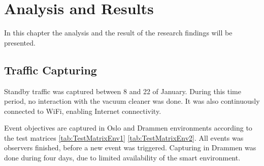 \chapter{Analysis and Results}
\label{cap:AnalysisandResults}
In this chapter the analysis and the result of the research findings will be presented. 

\section{Traffic Capturing}
Standby traffic was captured between 8 and 22  of January. During this time period, no interaction with the vacuum cleaner was done. It was also continuously connected to WiFi, enabling Internet connectivity.

Event objectives are captured in Oslo and Drammen environments according to the test matrices \ref{tab:TestMatrixEnv1} \ref{tab:TestMatrixEnv2}. All events was observers finished, before a new event was triggered. Capturing in Drammen was done during four days, due to limited availability of the smart environment.  
